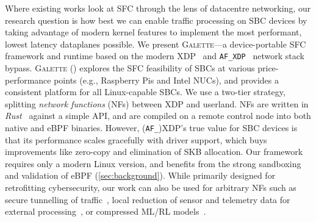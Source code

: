 \documentclass[comsoc, conference, times]{IEEEtran}
\newcommand{\ourtech}{\textsc{Galette}}
\newcommand{\afxdp}{\texttt{AF\_XDP}}
\newcommand{\af}{(\texttt{AF\_})XDP}
\begin{document}
Where existing works look at SFC through the lens of datacentre networking, our research question is how best we can enable traffic processing on SBC devices by taking advantage of modern kernel features to implement the most performant, lowest latency dataplanes possible.
We present \ourtech{}---a device-portable SFC framework and runtime based on the modern XDP~\parencite{DBLP:conf/conext/Hoiland-Jorgensen18} and \afxdp{}~\parencite{lwn-af-xdp} network stack bypass.
\ourtech{} () explores the SFC feasibility of SBCs at various price-performance points (e.g., Raspberry Pis and Intel NUCs), and provides a consistent platform for all Linux-capable SBCs.
We use a two-tier strategy, splitting \emph{network functions} (NFs) between XDP and userland.%
NFs are written in \emph{Rust}~\parencite{rust} against a simple API, and are compiled on a remote control node into both native and eBPF binaries.
However, \af{}'s true value for SBC devices is that its performance scales gracefully with driver support, which buys improvements like zero-copy and elimination of SKB allocation.
Our framework requires only a modern Linux version, and benefits from the strong sandboxing and validation of eBPF (\cref{sec:background}).
While primarily designed for retrofitting cybersecurity, our work can also be used for arbitrary NFs such as secure tunnelling of traffic~\parencite{electric-imp}, local reduction of sensor and telemetry data for external processing~\parencite{DBLP:conf/globecom/SimpsonCP20}, or compressed ML/RL models~\parencite{DBLP:conf/noms/SimpsonP22,DBLP:conf/nsdi/SiracusanoGSMAC22}.

\end{document}

